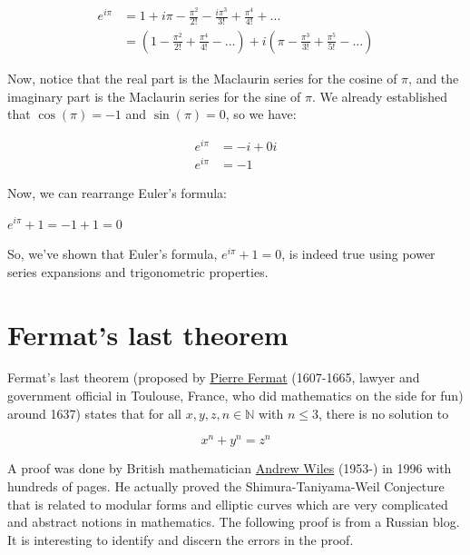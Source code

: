 \documentclass{article}
\begin{document}
\begin{equation*}
  \begin{aligned}
    e^{i\pi} &= 1 + i\pi - \frac{\pi^2}{2!}  - \frac{i\pi^3}{3!} + \frac{\pi^4}{4!}  + \ldots \\
    &= (1 - \frac{\pi^2}{2!} + \frac{\pi^4}{4!} - \ldots)  + i(\pi - \frac{\pi^3}{3!} + \frac{\pi^5}{5!} - \ldots)
  \end{aligned}
\end{equation*}

Now, notice that the real part is the Maclaurin series for the cosine of $\pi$, and the imaginary part is the Maclaurin series for the sine of $\pi$. We already established that $\cos(\pi) = -1$ and $\sin(\pi) = 0$, so we have:

\begin{equation*}
  \begin{aligned}
    e^{i\pi} &= -i + 0i \\
    e^{i\pi} &= -1    
  \end{aligned}
\end{equation*}

Now, we can rearrange Euler's formula:

$e^{i\pi} + 1 = -1 + 1 = 0$

So, we've shown that Euler's formula, $e^{i\pi} + 1 = 0$, is indeed true using power series expansions and trigonometric properties.

\section{Fermat's last theorem}

Fermat's last theorem (proposed by \href{https://en.wikipedia.org/wiki/Pierre_de_Fermat}{Pierre Fermat} (1607-1665, lawyer and government oﬀicial in Toulouse, France, who did mathematics on the side for fun) around 1637) states that for all $x, y, z, n \in \mathbb{N} $ with $n \leq 3$, there is no solution to

\begin{equation*}
  x^n + y^n = z^n
\end{equation*}

A proof was done by British mathematician \href{https://en.wikipedia.org/wiki/Andrew_Wiles}{Andrew Wiles} (1953-) in 1996 with hundreds of pages. He actually proved the Shimura-Taniyama-Weil Conjecture that is related to modular forms and elliptic curves which are very complicated and abstract notions in mathematics. The following proof is from a Russian blog. It is interesting to identify and discern the errors in the proof.
\end{document}

